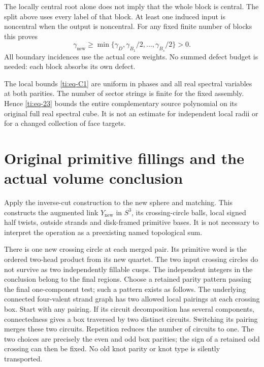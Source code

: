 \documentclass[11pt]{article}
\numberwithin{equation}{section}
\theoremstyle{definition}\newtheorem{definition}[theorem]{Definition}
\theoremstyle{remark}\newtheorem{remark}[theorem]{Remark}
\begin{document}
The locally central root alone does not imply that the whole block is central. The split above uses every label of that block. At least one induced input is noncentral when the output is noncentral. For any fixed finite number of blocks this proves
\begin{equation}\label{ti:eq-23}
\gamma_{\mathrm{new}}\ge
\min\{\gamma_D,\gamma_{B_1}/2,\ldots,\gamma_{B_s}/2\}>0.
\end{equation}
All boundary incidences use the actual core weights. No summed defect budget is needed: each block absorbs its own defect.

The local bounds \eqref{ti:eq-C1} are uniform in phases and all real spectral variables at both parities. The number of sector strings is finite for the fixed assembly. Hence \eqref{ti:eq-23} bounds the entire complementary source polynomial on its original full real spectral cube. It is not an estimate for independent local radii or for a changed collection of face targets.

\section{Original primitive fillings and the actual volume conclusion}\label{ti:sec-7}

Apply the inverse-cut construction to the new sphere and matching. This constructs the augmented link \(Y_{\mathrm{new}}\) in \(S^3\), its crossing-circle balls, local signed half twists, outside strands and disk-framed primitive bases. It is not necessary to interpret the operation as a preexisting named topological sum.

There is one new crossing circle at each merged pair. Its primitive word is the ordered two-head product from its new quartet. The two input crossing circles do not survive as two independently fillable cusps. The independent integers in the conclusion belong to the final regions. Choose a retained parity pattern passing the final one-component test; such a pattern exists as follows. The underlying connected four-valent
strand graph has two allowed local pairings at each crossing box. Start
with any pairing. If its circuit decomposition has several components,
connectedness gives a box traversed by two distinct circuits. Switching
its pairing merges these two circuits. Repetition reduces the number
of circuits to one. The two choices are precisely the even and odd
box parities; the sign of a retained odd crossing can then be fixed. No old knot parity or knot type is silently transported.
\end{document}
